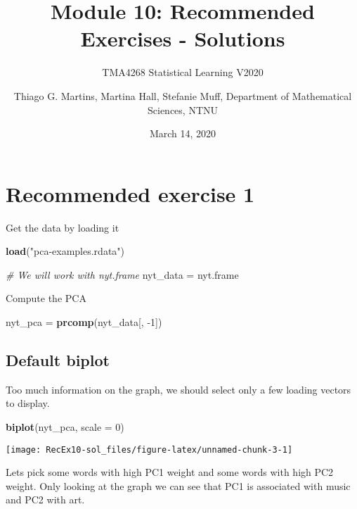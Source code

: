 \documentclass[]{article}
\title{Module 10: Recommended Exercises - Solutions}
\subtitle{TMA4268 Statistical Learning V2020}
\author{Thiago G. Martins, Martina Hall, Stefanie Muff, Department of
Mathematical Sciences, NTNU}
\date{March 14, 2020}
\newenvironment{Shaded}{\begin{snugshade}}{\end{snugshade}}
\newcommand{\CommentTok}[1]{\textcolor[rgb]{0.56,0.35,0.01}{\textit{#1}}}
\newcommand{\DataTypeTok}[1]{\textcolor[rgb]{0.13,0.29,0.53}{#1}}
\newcommand{\DecValTok}[1]{\textcolor[rgb]{0.00,0.00,0.81}{#1}}
\newcommand{\KeywordTok}[1]{\textcolor[rgb]{0.13,0.29,0.53}{\textbf{#1}}}
\newcommand{\NormalTok}[1]{#1}
\newcommand{\StringTok}[1]{\textcolor[rgb]{0.31,0.60,0.02}{#1}}
\begin{document}
\maketitle

\hypertarget{recommended-exercise-1}{%
\section{Recommended exercise 1}\label{recommended-exercise-1}}

Get the data by loading it

\begin{Shaded}
\begin{Highlighting}[]
\KeywordTok{load}\NormalTok{(}\StringTok{"pca-examples.rdata"}\NormalTok{)}

\CommentTok{# We will work with nyt.frame}
\NormalTok{nyt_data =}\StringTok{ }\NormalTok{nyt.frame}
\end{Highlighting}
\end{Shaded}

Compute the PCA

\begin{Shaded}
\begin{Highlighting}[]
\NormalTok{nyt_pca =}\StringTok{ }\KeywordTok{prcomp}\NormalTok{(nyt_data[, }\DecValTok{-1}\NormalTok{])}
\end{Highlighting}
\end{Shaded}

\hypertarget{default-biplot}{%
\subsection{Default biplot}\label{default-biplot}}

Too much information on the graph, we should select only a few loading
vectors to display.

\begin{Shaded}
\begin{Highlighting}[]
\KeywordTok{biplot}\NormalTok{(nyt_pca, }\DataTypeTok{scale =} \DecValTok{0}\NormalTok{)}
\end{Highlighting}
\end{Shaded}

\begin{center}\texttt{[image: RecEx10-sol\_files/figure-latex/unnamed-chunk-3-1]} \end{center}

Lets pick some words with high PC1 weight and some words with high PC2
weight. Only looking at the graph we can see that PC1 is associated with
music and PC2 with art.
\end{document}
